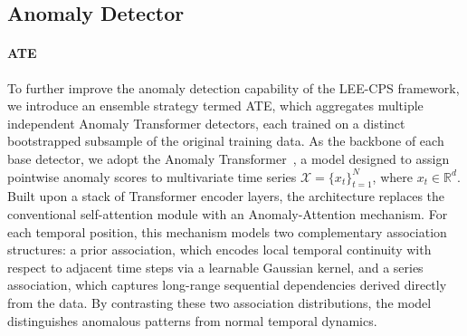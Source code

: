 \documentclass[pdflatex,sn-mathphys-num]{sn-jnl}
\theoremstyle{thmstyleone}
\theoremstyle{thmstyletwo}
\theoremstyle{thmstylethree}
\begin{document}
\subsection{Anomaly Detector}
\paragraph{ATE}
To further improve the anomaly detection capability of the LEE-CPS framework, we introduce an ensemble strategy termed ATE, which aggregates multiple independent Anomaly Transformer detectors, each trained on a distinct bootstrapped subsample of the original training data. As the backbone of each base detector, we adopt the Anomaly Transformer~\cite{xu2022anomaly}, a model designed to assign pointwise anomaly scores to multivariate time series $\mathcal{X} = \{x_t\}_{t=1}^{N}$, where $x_t \in \mathbb{R}^{d}$. Built upon a stack of Transformer encoder layers, the architecture replaces the conventional self-attention module with an Anomaly-Attention mechanism. 
For each temporal position, this mechanism models two complementary association structures: a prior association, which encodes local temporal continuity with respect to adjacent time steps via a learnable Gaussian kernel, and a series association, which captures long-range sequential dependencies derived directly from the data. By contrasting these two association distributions, the model distinguishes anomalous patterns from normal temporal dynamics.
\end{document}

